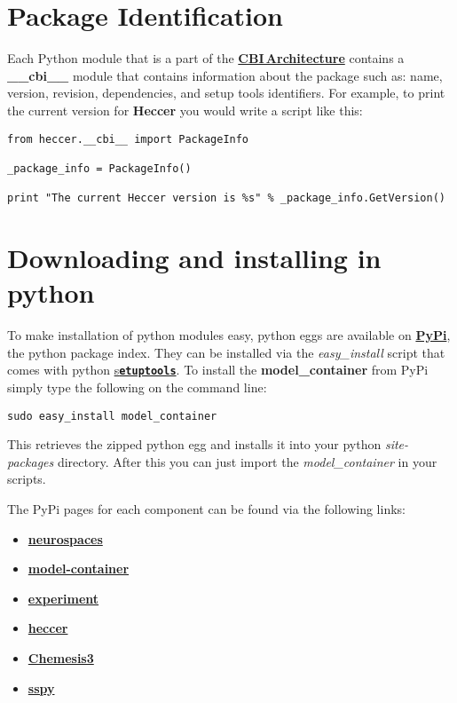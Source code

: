 \documentclass[12pt]{article}
\begin{document}
\section*{Package Identification}

	Each Python module that is a part of the \href{../cbi-architecture/cbi-architecture.tex}{\bf CBI\,Architecture} contains a {\bf \_\_cbi\_\_} module that contains information about the package such as: name, version, revision, dependencies, and setup tools identifiers. For example, to print the current version for {\bf Heccer} you would write a script like this:
	
\begin{verbatim}
from heccer.__cbi__ import PackageInfo

_package_info = PackageInfo()

print "The current Heccer version is %s" % _package_info.GetVersion()

\end{verbatim}

\section*{Downloading and installing in python}

	To make installation of python modules easy, python eggs are available on \href{http://pypi.python.org/}{\bf PyPi}, the python package index.  They can be installed via the {\it easy\_install} script that comes with python \href{http://pypi.python.org/pypi?:action=display&name=setuptools}{s\bf \tt etuptools}. To install the {\bf model\_container} from PyPi simply type the following on the command line:
	
\begin{verbatim}
sudo easy_install model_container 
\end{verbatim}

This retrieves the zipped python egg and installs it into your python {\it site-packages} directory. After this you can just import the {\it model\_container} in your scripts. 

The PyPi pages for each component can be found via the following links:

\begin{itemize}
\item[] \href{http://pypi.python.org/pypi/neurospaces}{\bf neurospaces}
\item[] \href{http://pypi.python.org/pypi/model-container}{\bf model-container}
\item[] \href{http://pypi.python.org/pypi/experiment}{\bf experiment}
\item[] \href{http://pypi.python.org/pypi/heccer}{\bf heccer}
\item[] \href{http://pypi.python.org/pypi/chemesis3}{\bf Chemesis3}
\item[] \href{http://pypi.python.org/pypi/sspy}{\bf sspy}
\end{itemize}
\end{document}
